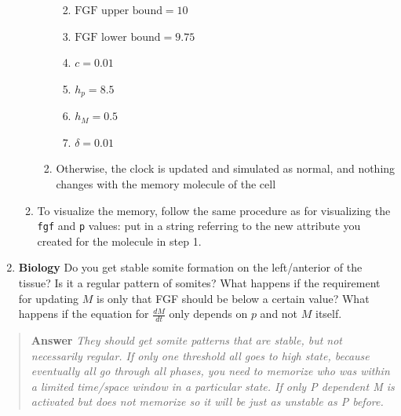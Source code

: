 \documentclass[
  letterpaper,
  DIV=11,
  numbers=noendperiod]{scrreprt}
\providecommand{\tightlist}{%
  \setlength{\itemsep}{0pt}\setlength{\parskip}{0pt}}\usepackage{longtable,booktabs,array}
\theoremstyle{definition}
\theoremstyle{remark}
\begin{document}
\begin{enumerate}
\begin{enumerate}
\begin{enumerate}
      \begin{enumerate}
      \def\labelenumiv{\arabic{enumiv}.}
      \tightlist
      \item
        \(\text{FGF upper bound}=10\)
      \item
        \(\text{FGF lower bound}=9.75\)
      \item
        \(c=0.01\)
      \item
        \(h_p=8.5\)
      \item
        \(h_M=0.5\)
      \item
        \(\delta=0.01\)
      \end{enumerate}
    \item
      Otherwise, the clock is updated and simulated as normal, and
      nothing changes with the memory molecule of the cell
    \end{enumerate}
  \item
    To visualize the memory, follow the same procedure as for
    visualizing the \texttt{fgf} and \texttt{p} values: put in a string
    referring to the new attribute you created for the molecule in step
    1.
  \end{enumerate}
\item
  \textbf{Biology} Do you get stable somite formation on the
  left/anterior of the tissue? Is it a regular pattern of somites? What
  happens if the requirement for updating \(M\) is only that FGF should
  be below a certain value? What happens if the equation for
  \(\frac{dM}{dt}\) only depends on \(p\) and not \(M\) itself.
\end{enumerate}

\begin{quote}
\textbf{Answer} \emph{They should get somite patterns that are stable,
but not necessarily regular. If only one threshold all goes to high
state, because eventually all go through all phases, you need to
memorize who was within a limited time/space window in a particular
state. If only P dependent M is activated but does not memorize so it
will be just as unstable as P before.}
\end{quote}
\end{document}

